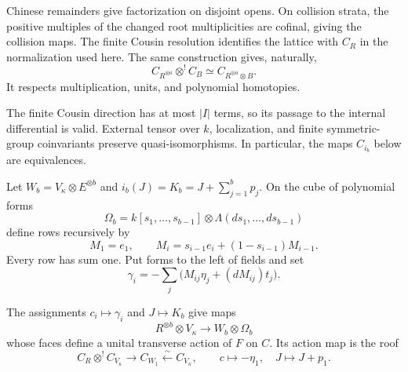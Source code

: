 Chinese remainders give factorization on disjoint opens.
On collision strata, the positive multiples of the changed
root multiplicities are cofinal, giving the collision maps.
The finite Cousin resolution identifies the lattice with
$C_R$ in the normalization used here.
The same construction gives, naturally,
\[
 C_{R^{\otimes a}}\otimes^!C_B
 \simeq C_{R^{\otimes a}\otimes B}.
\]
It respects multiplication, units, and polynomial homotopies.

The finite Cousin direction has at most $|I|$ terms,
so its passage to the internal differential is valid.
External tensor over $k$, localization, and finite
symmetric-group coinvariants preserve quasi-isomorphisms.
In particular, the maps $C_{i_b}$ below are equivalences.

Let $W_b=V_\kappa\otimes E^{\otimes b}$ and
$i_b(J)=K_b=J+\sum_{j=1}^bp_j$. On the cube of polynomial forms
\[
 \Omega_b=k[s_1,\ldots,s_{b-1}]
 \otimes\Lambda(ds_1,\ldots,ds_{b-1})
\]
define rows recursively by
\[
 M_1=e_1,\qquad
 M_i=s_{i-1}e_i+(1-s_{i-1})M_{i-1}.
\]
Every row has sum one. Put forms to the left of fields and set
\[
 \gamma_i=-\sum_j\bigl(M_{ij}\eta_j+(dM_{ij})t_j\bigr).
\]

\begin{proposition}
\label{v4-arith:centers:prop:ghost-action}
The assignments $c_i\mapsto\gamma_i$ and $J\mapsto K_b$
give maps
\[
 R^{\otimes b}\otimes V_\kappa\longrightarrow W_b\otimes\Omega_b
\]
whose faces define a unital transverse action of $F$ on $C$.
Its action map is the roof
\[
 C_R\otimes^!C_{V_\kappa}
 \longrightarrow C_{W_1}\xleftarrow{\sim}C_{V_\kappa},
 \qquad c\mapsto-\eta_1,\quad J\mapsto J+p_1.
\]
\end{proposition}

